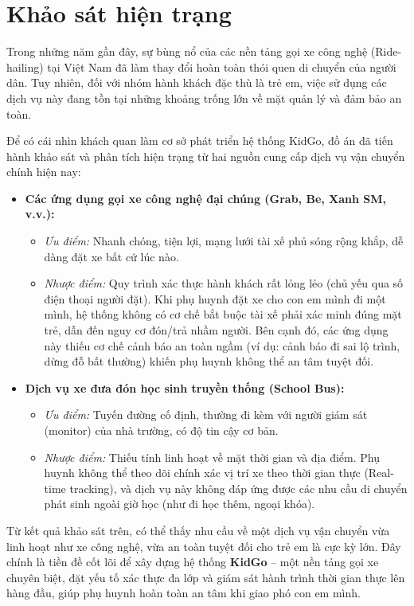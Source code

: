 \documentclass[../DoAn.tex]{subfiles}
\begin{document}
\section{Khảo sát hiện trạng}
\label{section:2.1}
Trong những năm gần đây, sự bùng nổ của các nền tảng gọi xe công nghệ (Ride-hailing) tại Việt Nam đã làm thay đổi hoàn toàn thói quen di chuyển của người dân. Tuy nhiên, đối với nhóm hành khách đặc thù là trẻ em, việc sử dụng các dịch vụ này đang tồn tại những khoảng trống lớn về mặt quản lý và đảm bảo an toàn.

Để có cái nhìn khách quan làm cơ sở phát triển hệ thống KidGo, đồ án đã tiến hành khảo sát và phân tích hiện trạng từ hai nguồn cung cấp dịch vụ vận chuyển chính hiện nay:
\begin{itemize}
    \item \textbf{Các ứng dụng gọi xe công nghệ đại chúng (Grab, Be, Xanh SM, v.v.):}
          \begin{itemize}
              \item \textit{Ưu điểm:} Nhanh chóng, tiện lợi, mạng lưới tài xế phủ sóng rộng khắp, dễ dàng đặt xe bất cứ lúc nào.
              \item \textit{Nhược điểm:} Quy trình xác thực hành khách rất lỏng lẻo (chủ yếu qua số điện thoại người đặt). Khi phụ huynh đặt xe cho con em mình đi một mình, hệ thống không có cơ chế bắt buộc tài xế phải xác minh đúng mặt trẻ, dẫn đến nguy cơ đón/trả nhầm người. Bên cạnh đó, các ứng dụng này thiếu cơ chế cảnh báo an toàn ngầm (ví dụ: cảnh báo đi sai lộ trình, dừng đỗ bất thường) khiến phụ huynh không thể an tâm tuyệt đối.
          \end{itemize}
    \item \textbf{Dịch vụ xe đưa đón học sinh truyền thống (School Bus):}
          \begin{itemize}
              \item \textit{Ưu điểm:} Tuyến đường cố định, thường đi kèm với người giám sát (monitor) của nhà trường, có độ tin cậy cơ bản.
              \item \textit{Nhược điểm:} Thiếu tính linh hoạt về mặt thời gian và địa điểm. Phụ huynh không thể theo dõi chính xác vị trí xe theo thời gian thực (Real-time tracking), và dịch vụ này không đáp ứng được các nhu cầu di chuyển phát sinh ngoài giờ học (như đi học thêm, ngoại khóa).
          \end{itemize}
\end{itemize}

Từ kết quả khảo sát trên, có thể thấy nhu cầu về một dịch vụ vận chuyển vừa linh hoạt như xe công nghệ, vừa an toàn tuyệt đối cho trẻ em là cực kỳ lớn. Đây chính là tiền đề cốt lõi để xây dựng hệ thống \textbf{KidGo} – một nền tảng gọi xe chuyên biệt, đặt yếu tố xác thực đa lớp và giám sát hành trình thời gian thực lên hàng đầu, giúp phụ huynh hoàn toàn an tâm khi giao phó con em mình.
\end{document}

